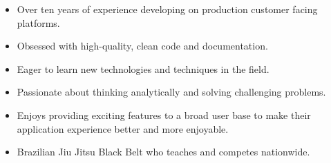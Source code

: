\documentclass[10pt,a4paper]{resume}
\begin{document}





\begin{fullwidth}
\makecvheader
\end{fullwidth}





\begin{itemize}
\item Over ten years of experience developing on production customer facing platforms.
\item Obsessed with high-quality, clean code and documentation.
\item Eager to learn new technologies and techniques in the field.
\item Passionate about thinking analytically and solving challenging problems.
\item Enjoys providing exciting features to a broad user base to make their application experience better and more enjoyable.
\item Brazilian Jiu Jitsu Black Belt who teaches and competes nationwide.
\end{itemize}

\end{document}
